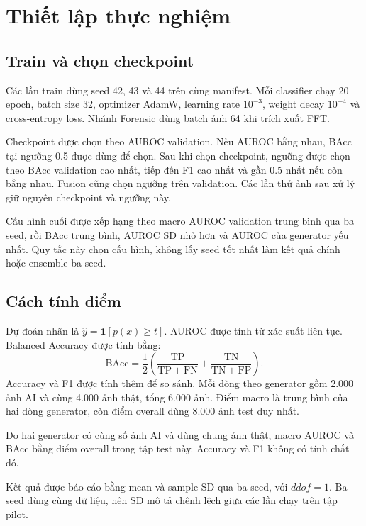 \section{Thiết lập thực nghiệm}
\subsection{Train và chọn checkpoint}
Các lần train dùng seed 42, 43 và 44 trên cùng manifest. Mỗi classifier chạy 20 epoch, batch size 32, optimizer AdamW, learning rate $10^{-3}$, weight decay $10^{-4}$ và cross-entropy loss. Nhánh Forensic dùng batch ảnh 64 khi trích xuất FFT.

Checkpoint được chọn theo AUROC validation. Nếu AUROC bằng nhau, BAcc tại ngưỡng 0.5 được dùng để chọn. Sau khi chọn checkpoint, ngưỡng được chọn theo BAcc validation cao nhất, tiếp đến F1 cao nhất và gần 0.5 nhất nếu còn bằng nhau. Fusion cũng chọn ngưỡng trên validation. Các lần thử ảnh sau xử lý giữ nguyên checkpoint và ngưỡng này.

Cấu hình cuối được xếp hạng theo macro AUROC validation trung bình qua ba seed, rồi BAcc trung bình, AUROC SD nhỏ hơn và AUROC của generator yếu nhất. Quy tắc này chọn cấu hình, không lấy seed tốt nhất làm kết quả chính hoặc ensemble ba seed.

\subsection{Cách tính điểm}
Dự đoán nhãn là $\hat y=\mathbf{1}[p(x)\geq t]$. AUROC được tính từ xác suất liên tục. Balanced Accuracy được tính bằng:
\begin{equation}
\mathrm{BAcc}=\frac12\left(\frac{\mathrm{TP}}{\mathrm{TP}+\mathrm{FN}}+
\frac{\mathrm{TN}}{\mathrm{TN}+\mathrm{FP}}\right).
\end{equation}
Accuracy và F1 được tính thêm để so sánh. Mỗi dòng theo generator gồm 2.000 ảnh AI và cùng 4.000 ảnh thật, tổng 6.000 ảnh. Điểm macro là trung bình của hai dòng generator, còn điểm overall dùng 8.000 ảnh test duy nhất.

Do hai generator có cùng số ảnh AI và dùng chung ảnh thật, macro AUROC và BAcc bằng điểm overall trong tập test này. Accuracy và F1 không có tính chất đó.

Kết quả được báo cáo bằng mean và sample SD qua ba seed, với $ddof=1$. Ba seed dùng cùng dữ liệu, nên SD mô tả chênh lệch giữa các lần chạy trên tập pilot.

